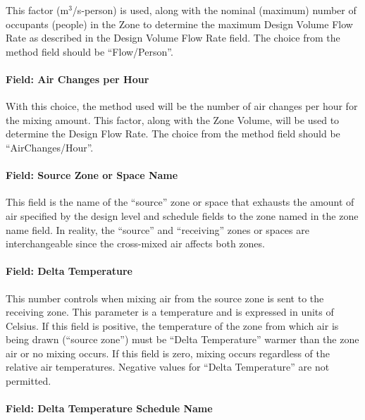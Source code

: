 This factor (m\(^{3}\)/s-person) is used, along with the nominal (maximum) number of occupants (people) in the Zone to determine the maximum Design Volume Flow Rate as described in the Design Volume Flow Rate field. The choice from the method field should be ``Flow/Person''.

\paragraph{Field: Air Changes per Hour}\label{field-air-changes-per-hour-3}

With this choice, the method used will be the number of air changes per hour for the mixing amount. This factor, along with the Zone Volume, will be used to determine the Design Flow Rate. The choice from the method field should be ``AirChanges/Hour''.

\paragraph{Field: Source Zone or Space Name}\label{field-source-zone-name-1}

This field is the name of the ``source'' zone or space that exhausts the amount of air specified by the design level and schedule fields to the zone named in the zone name field. In reality, the ``source'' and ``receiving'' zones or spaces are interchangeable since the cross-mixed air affects both zones.

\paragraph{Field: Delta Temperature}\label{field-delta-temperature-3}

This number controls when mixing air from the source zone is sent to the receiving zone. This parameter is a temperature and is expressed in units of Celsius. If this field is positive, the temperature of the zone from which air is being drawn (``source zone'') must be ``Delta Temperature'' warmer than the zone air or no mixing occurs. If this field is zero, mixing occurs regardless of the relative air temperatures. Negative values for ``Delta Temperature'' are not permitted.

\paragraph{Field: Delta Temperature Schedule Name}\label{field-delta-temperature-schedule-name-3}

